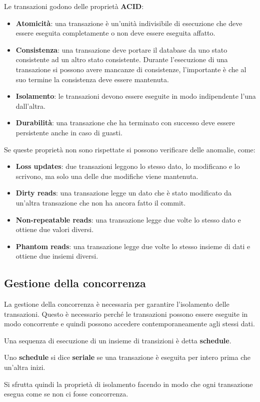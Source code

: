Le transazioni godono delle proprietà \textbf{ACID}:
\begin{itemize}
      \item \textbf{Atomicità}: una transazione è un'unità indivisibile di
            esecuzione che deve essere eseguita completamente o non deve essere
            eseguita affatto.
      \item \textbf{Consistenza}: una transazione deve portare il database da uno
            stato consistente ad un altro stato consistente. Durante l'esecuzione
            di una transazione si possono avere mancanze di consistenze, l'importante
            è che al suo termine la consistenza deve essere mantenuta.
      \item \textbf{Isolamento}: le transazioni devono essere eseguite in modo
            indipendente l'una dall'altra.
      \item \textbf{Durabilità}: una transazione che ha terminato con successo
            deve essere persistente anche in caso di guasti.
\end{itemize}
Se queste proprietà non sono rispettate si possono verificare delle anomalie,
come:
\begin{itemize}
      \item \textbf{Loss updates}: due transazioni leggono lo stesso
            dato, lo modificano e lo scrivono, ma solo una delle due modifiche
            viene mantenuta.
      \item \textbf{Dirty reads}: una transazione legge un dato che è stato
            modificato da un'altra transazione che non ha ancora fatto il commit.
      \item \textbf{Non-repeatable reads}: una transazione legge due
            volte lo stesso dato e ottiene due valori diversi.
      \item \textbf{Phantom reads}: una transazione legge due volte lo stesso
            insieme di dati e ottiene due insiemi diversi.
\end{itemize}
\subsection{Gestione della concorrenza}
La gestione della concorrenza è necessaria per garantire l'isolamento delle
transazioni. Questo è necessario perché le transazioni possono essere eseguite
in modo concorrente e quindi possono accedere contemporaneamente agli stessi
dati.
\begin{definizione}
      Una sequenza di esecuzione di un insieme di transizioni è detta \textbf{schedule}.
\end{definizione}
\begin{definizione}
      Uno \textbf{schedule} si dice \textbf{seriale} se una transazione è eseguita
      per intero prima che un'altra inizi.
\end{definizione}
Si sfrutta quindi la proprietà di isolamento facendo in modo che ogni
transazione esegua come se non ci fosse concorrenza.


